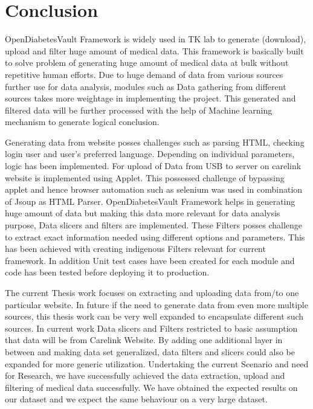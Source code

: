 \documentclass[article,type=msc,colorback,accentcolor=tud9c,twoside,11pt]{tudthesis}
\begin{document}
	\clearpage
	\section{Conclusion}
	OpenDiabetesVault Framework is widely used in TK lab to generate (download), upload and filter huge amount of medical data. This framework is basically built to solve problem of generating huge amount of medical data at bulk without repetitive human efforts. Due to huge demand of data from various sources further use for data analysis, modules such as Data gathering from different sources takes more weightage in implementing the project. This generated and filtered data will be further processed with the help of Machine learning mechanism to generate logical conclusion. 
	
	Generating data from website posses challenges such as parsing HTML, checking login user and user's preferred language. Depending on individual parameters, logic has been implemented. For upload of Data from USB to server on carelink website is implemented using Applet. This possessed challenge of bypassing applet and hence browser automation such as selenium was used in combination of Jsoup as HTML Parser. OpenDiabetesVault Framework helps in generating huge amount of data but making this data more relevant for data analysis purpose, Data slicers and filters are implemented. These Filters posses challenge to extract exact information needed using different options and parameters. This has been achieved with creating indigenous Filters relevant for current framework.  In addition Unit test cases have been created for each module and code has been tested before deploying it to production.
	
	The current Thesis work focuses on extracting and uploading data from/to one particular website. In future if the need to generate data from even more multiple sources, this thesis work can be very well expanded to encapsulate different such sources. In current work Data slicers and Filters restricted to basic assumption that data will be from Carelink Website. By adding one additional layer in between and making data set generalized, data filters and slicers could also be expanded for more generic utilization. Undertaking the current Scenario and need for Research, we have successfully achieved the data extraction, upload and filtering of medical data successfully. We have obtained the expected results on our dataset and we expect the same behaviour on a very large dataset.
	
	
	\cleardoublepage
	\cleardoublepage
	
	
\end{document}
